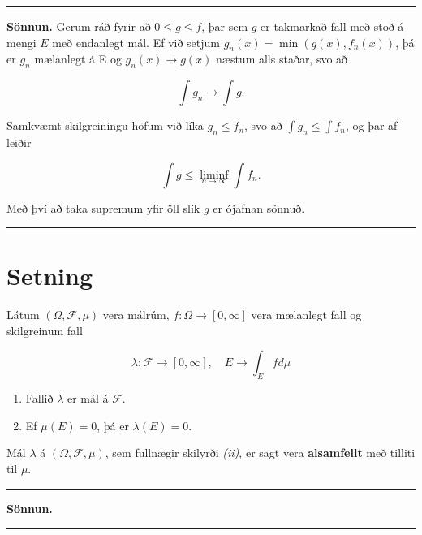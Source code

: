 \documentclass[]{book}
\begin{document}
\begin{center}\rule{0.5\linewidth}{\linethickness}\end{center}

\textbf{Sönnun.} Gerum ráð fyrir að \(0 \leq g \leq f\), þar sem \(g\) er takmarkað fall með stoð á mengi \(E\) með endanlegt mál. Ef við setjum \(g_n(x) = \min(g(x),f_n(x))\), þá er \(g_n\) mælanlegt á E og \(g_n(x) \rightarrow g(x)\) næstum alls staðar, svo að

\[
\int g_n \rightarrow \int g.
\]

Samkvæmt skilgreiningu höfum við líka \(g_n \leq f_n\), svo að \(\int g_n \leq \int f_n\), og þar af leiðir

\[
\int g \leq \liminf_{n\rightarrow \infty}\int f_n.
\]

Með því að taka supremum yfir öll slík \(g\) er ójafnan sönnuð.

\begin{center}\rule{0.5\linewidth}{\linethickness}\end{center}

\hypertarget{setning-48}{%
\section{Setning}\label{setning-48}}

Látum \((\Omega, \mathcal F, \mu)\) vera málrúm, \(f:\Omega\rightarrow[0, \infty]\) vera mælanlegt fall og skilgreinum fall

\[
\lambda:\mathcal F \rightarrow [0,\infty], \quad E\rightarrow \int_E fd\mu
\]

\begin{enumerate}
\def\labelenumi{\arabic{enumi}.}
\item
  Fallið \(\lambda\) er mál á \(\mathcal F\).
\item
  Ef \(\mu(E) = 0\), þá er \(\lambda(E) = 0\).
\end{enumerate}

Mál \(\lambda\) á \((\Omega, \mathcal F, \mu)\), sem fullnægir skilyrði \emph{(ii)}, er sagt vera \textbf{alsamfellt} með tilliti til \(\mu\).

\begin{center}\rule{0.5\linewidth}{\linethickness}\end{center}

\textbf{Sönnun.}

\begin{center}\rule{0.5\linewidth}{\linethickness}\end{center}
\end{document}

